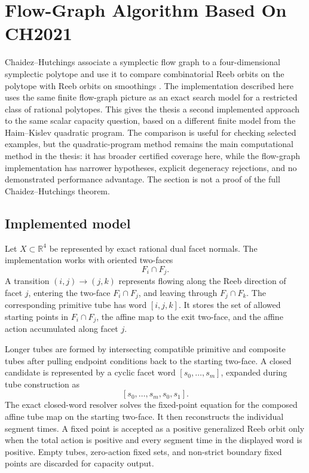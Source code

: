 \section{Flow-Graph Algorithm Based On CH2021}\label{sec:flow-graph-algorithm-ch2021}

Chaidez--Hutchings associate a symplectic flow graph to a
four-dimensional symplectic polytope and use it to compare combinatorial Reeb
orbits on the polytope with Reeb orbits on smoothings
\cite{CH2021}.  The implementation described here uses the same finite
flow-graph picture as an exact search model for a restricted class of rational
polytopes.  This gives the thesis a second implemented approach to the same
scalar capacity question, based on a different finite model from the
Haim--Kislev quadratic program.  The comparison is useful for checking selected
examples, but the quadratic-program method remains the main computational
method in the thesis: it has broader certified coverage here, while the
flow-graph implementation has narrower hypotheses, explicit degeneracy
rejections, and no demonstrated performance advantage.  The section is not a
proof of the full Chaidez--Hutchings theorem.

\subsection{Implemented model}\label{subsec:flow-graph-algorithm-ch2021-definition}

Let \(X\subset \mathbb R^4\) be represented by exact rational dual facet
normals.  The implementation works with oriented two-faces
\[
  F_i\cap F_j .
\]
A transition \((i,j)\to(j,k)\) represents flowing along the Reeb direction of
facet \(j\), entering the two-face \(F_i\cap F_j\), and leaving through
\(F_j\cap F_k\).  The corresponding primitive tube has word \([i,j,k]\).  It
stores the set of allowed starting points in \(F_i\cap F_j\), the affine map to
the exit two-face, and the affine action accumulated along facet \(j\).

Longer tubes are formed by intersecting compatible primitive and composite
tubes after pulling endpoint conditions back to the starting two-face.  A
closed candidate is represented by a cyclic facet word
\([s_0,\ldots,s_m]\), expanded during tube construction as
\[
  [s_0,\ldots,s_m,s_0,s_1].
\]
The exact closed-word resolver solves the fixed-point equation for the
composed affine tube map on the starting two-face.  It then reconstructs the
individual segment times.  A fixed point is accepted as a positive
generalized Reeb orbit only when the total action is positive and every
segment time in the displayed word is positive.  Empty tubes, zero-action
fixed sets, and non-strict boundary fixed points are discarded for capacity
output.

